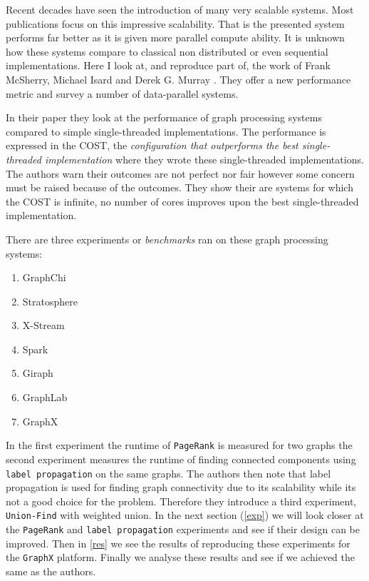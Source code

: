 Recent decades have seen the introduction of many very scalable systems. Most publications focus on this impressive scalability. That is the presented system performs far better as it is given more parallel compute ability. It is unknown how these systems compare to classical non distributed or even sequential implementations. Here I look at, and reproduce part of, the work of Frank McSherry, Michael Isard and Derek G. Murray \cite{189908}. They offer a new performance metric and survey a number of data-parallel systems.

In their paper they look at the performance of graph processing systems compared to simple single-threaded implementations. The performance is expressed in the COST, the \textit{configuration that outperforms the best single-threaded implementation} where they wrote these single-threaded implementations. The authors warn their outcomes are not perfect nor fair however some concern must be raised because of the outcomes. They show their are systems for which the COST is infinite, no number of cores improves upon the best single-threaded implementation.

There are three experiments or \textit{benchmarks} ran on these graph processing systems:

\begin{multicols}{2}
\begin{enumerate}
	\item GraphChi 
	\item Stratosphere
	\item X-Stream
	\item Spark
	\item Giraph
	\item GraphLab
	\item GraphX
\end{enumerate}
\end{multicols}

In the first experiment the runtime of \texttt{PageRank} is measured for two graphs the second experiment measures the runtime of finding connected components using \texttt{label propagation} on the same graphs. The authors then note that label propagation is used for finding graph connectivity due to its scalability while its not a good choice for the problem. Therefore they introduce a third experiment, \texttt{Union-Find} with weighted union. In the next section (\cref{exp}) we will look closer at the \texttt{PageRank} and \texttt{label propagation} experiments and see if their design can be improved. Then in \cref{res} we see the results of reproducing these experiments for the \texttt{GraphX} platform. Finally we analyse these results and see if we achieved the same as the authors.
